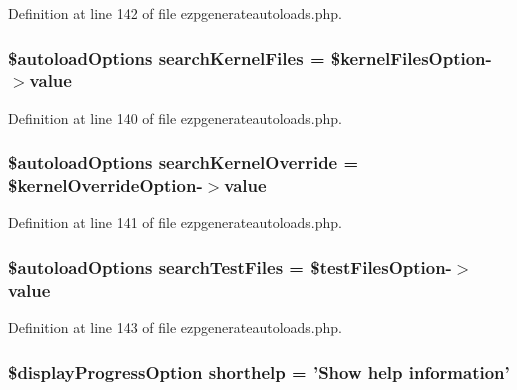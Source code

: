 \-Definition at line 142 of file ezpgenerateautoloads.\-php.

\hypertarget{ezpgenerateautoloads_8php_aab46cc9fff71273094aafac8ebd689d4}{
\subsubsection[{search\-Kernel\-Files}]{\setlength{\rightskip}{0pt plus 5cm}\$autoload\-Options {\bf search\-Kernel\-Files} = \$kernel\-Files\-Option-\/$>$value}}\label{ezpgenerateautoloads_8php_aab46cc9fff71273094aafac8ebd689d4}


\-Definition at line 140 of file ezpgenerateautoloads.\-php.

\hypertarget{ezpgenerateautoloads_8php_af86b9a19664645803f32b4d5bb872ff1}{
\subsubsection[{search\-Kernel\-Override}]{\setlength{\rightskip}{0pt plus 5cm}\$autoload\-Options {\bf search\-Kernel\-Override} = \$kernel\-Override\-Option-\/$>$value}}\label{ezpgenerateautoloads_8php_af86b9a19664645803f32b4d5bb872ff1}


\-Definition at line 141 of file ezpgenerateautoloads.\-php.

\hypertarget{ezpgenerateautoloads_8php_a3727c480754aa7c8b3dc7e8070ed1eb4}{
\subsubsection[{search\-Test\-Files}]{\setlength{\rightskip}{0pt plus 5cm}\$autoload\-Options {\bf search\-Test\-Files} = \$test\-Files\-Option-\/$>$value}}\label{ezpgenerateautoloads_8php_a3727c480754aa7c8b3dc7e8070ed1eb4}


\-Definition at line 143 of file ezpgenerateautoloads.\-php.

\hypertarget{ezpgenerateautoloads_8php_a6878132bff242d248a03a92df0ead036}{
\subsubsection[{shorthelp}]{\setlength{\rightskip}{0pt plus 5cm}\$display\-Progress\-Option {\bf shorthelp} = '\-Show help information'}}\label{ezpgenerateautoloads_8php_a6878132bff242d248a03a92df0ead036}



